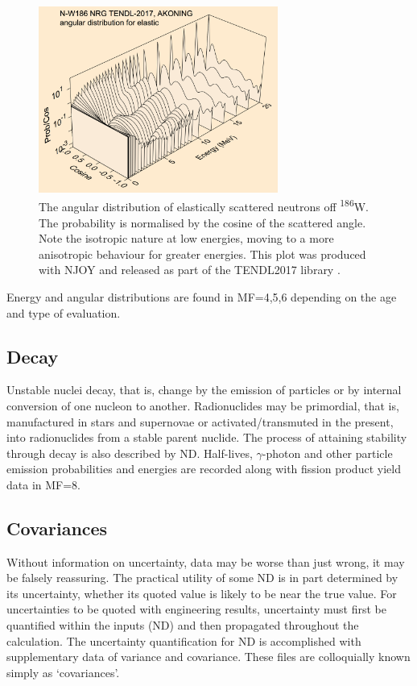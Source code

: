 \begin{figure}[ht]
  \includegraphics[width=0.7\textwidth]{tungsten_scatter}
  \caption{The angular distribution of elastically scattered neutrons off \textsuperscript{186}W. The probability is normalised by the cosine of the scattered angle. Note the isotropic nature at low energies, moving to a more anisotropic behaviour for greater energies. This plot was produced with NJOY \cite{MacFarlane2010} and released as part of the TENDL2017 library \cite{Rochman2016}.}
  \label{fig:tungsten_scatter}
\end{figure}

Energy and angular distributions are found in MF=4,5,6 depending on the age and type of evaluation.

\subsection{Decay}
Unstable nuclei decay, that is, change by the emission of particles or by internal conversion of one nucleon to another. Radionuclides may be primordial, that is, manufactured in stars and supernovae or activated/transmuted in the present, into radionuclides from a stable parent nuclide. The process of attaining stability through decay is also described by ND. Half-lives, $\gamma$-photon and other particle emission probabilities and energies are recorded along with fission product yield data in MF=8. 

\subsection{Covariances}
Without information on uncertainty, data may be worse than just wrong, it may be falsely reassuring. The practical utility of some ND is in part determined by its uncertainty, whether its quoted value is likely to be near the true value. For uncertainties to be quoted with engineering results, uncertainty must first be quantified within the inputs (ND) and then propagated throughout the calculation. The uncertainty quantification for ND is accomplished with supplementary data of variance and covariance. These files are colloquially known simply as `covariances'. 

